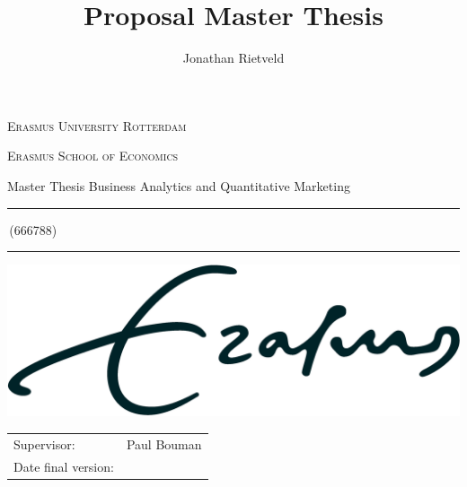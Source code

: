 \documentclass[a4paper,11pt]{report}
\author{Jonathan Rietveld}
\title{Proposal Master Thesis}
\newcommand{\studentnumber}{666788}
\newcommand{\program}{Business Analytics and Quantitative Marketing}
\newcommand{\supervisor}{Paul Bouman}
\begin{document}
\begin{titlepage}
\makeatletter
\begin{center}
	\textsc{Erasmus University Rotterdam}
	\par \textsc{Erasmus School of Economics}
	\par Master Thesis \program

	\vfill \hrule height .08em \bigskip
	\par\huge\@title\bigskip
	\par\Large\@author\,(\studentnumber)\bigskip
	\hrule height .08em\normalsize

	\vfill
	\includegraphics[width=\textwidth,height=0.15\textheight,keepaspectratio]{../eur}
	\vfill

	\begin{tabular}{ll}
		\toprule
		Supervisor: & \supervisor\\
		Date final version: & \@date\\
		\bottomrule
	\end{tabular}

	\vfill
\end{center}
\makeatother
\end{titlepage}





\end{document}
